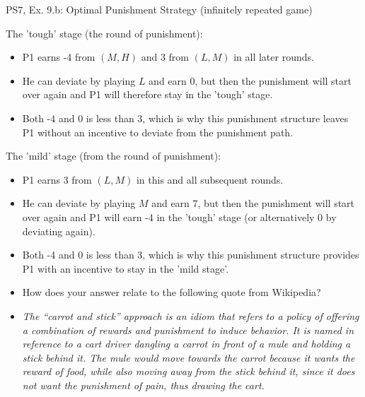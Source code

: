 \begin{frame}{PS7, Ex. 9.b: Optimal Punishment Strategy (infinitely repeated game)}
  \begin{multicols}{2}
    The 'tough' stage (the  round of punishment):\vspace{-4pt}
    \begin{itemize}
      \item P1 earns -4 from $(M, H)$ and 3 from $(L, M)$ in all later rounds.
      \item He can deviate by playing $L$ and earn 0, but then the punishment will start over again and P1 will therefore stay in the 'tough' stage.
      \item Both -4 and 0 is less than 3, which is why this punishment structure leaves P1 without an incentive to deviate from the punishment path.
    \end{itemize}
    \vfill\null\columnbreak
    The 'mild' stage (from the  round of punishment):\vspace{-4pt}
    \begin{itemize}
      \item P1 earns 3 from $(L, M)$ in this and all subsequent rounds.
      \item He can deviate by playing $M$ and earn 7, but then the punishment will start over again and P1 will earn -4 in the 'tough' stage (or alternatively 0 by deviating again).
      \item Both -4 and 0 is less than 3, which is why this punishment structure provides P1 with an incentive to stay in the 'mild stage'.
    \end{itemize}
    \vfill\null
  \end{multicols}
    \vspace{-24pt}
    \begin{itemize}
      \item[(b)] How does your answer relate to the following quote from Wikipedia?
      \item[] \textit{The “carrot and stick” approach is an idiom that refers to a policy of offering a combination of rewards and punishment to induce behavior. It is named in reference to a cart driver dangling a carrot in front of a mule and holding a stick behind it. The mule would move towards the carrot because it wants the reward of food, while also moving away from the stick behind it, since it does not want the punishment of pain, thus drawing the cart.}
    \end{itemize}
\end{frame}
